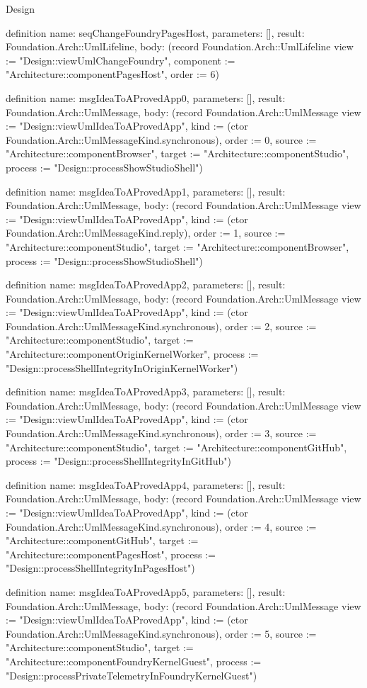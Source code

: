 \begin{lexlean}{Design}
\begin{semanticmodule}
definition{
  name: seqChangeFoundryPagesHost,
  parameters: [],
  result: Foundation.Arch::UmlLifeline,
  body: (record Foundation.Arch::UmlLifeline {view := "Design::viewUmlChangeFoundry", component := "Architecture::componentPagesHost", order := 6})
}

definition{
  name: msgIdeaToAProvedApp0,
  parameters: [],
  result: Foundation.Arch::UmlMessage,
  body: (record Foundation.Arch::UmlMessage {view := "Design::viewUmlIdeaToAProvedApp", kind := (ctor Foundation.Arch::UmlMessageKind.synchronous), order := 0, source := "Architecture::componentBrowser", target := "Architecture::componentStudio", process := "Design::processShowStudioShell"})
}

definition{
  name: msgIdeaToAProvedApp1,
  parameters: [],
  result: Foundation.Arch::UmlMessage,
  body: (record Foundation.Arch::UmlMessage {view := "Design::viewUmlIdeaToAProvedApp", kind := (ctor Foundation.Arch::UmlMessageKind.reply), order := 1, source := "Architecture::componentStudio", target := "Architecture::componentBrowser", process := "Design::processShowStudioShell"})
}

definition{
  name: msgIdeaToAProvedApp2,
  parameters: [],
  result: Foundation.Arch::UmlMessage,
  body: (record Foundation.Arch::UmlMessage {view := "Design::viewUmlIdeaToAProvedApp", kind := (ctor Foundation.Arch::UmlMessageKind.synchronous), order := 2, source := "Architecture::componentStudio", target := "Architecture::componentOriginKernelWorker", process := "Design::processShellIntegrityInOriginKernelWorker"})
}

definition{
  name: msgIdeaToAProvedApp3,
  parameters: [],
  result: Foundation.Arch::UmlMessage,
  body: (record Foundation.Arch::UmlMessage {view := "Design::viewUmlIdeaToAProvedApp", kind := (ctor Foundation.Arch::UmlMessageKind.synchronous), order := 3, source := "Architecture::componentStudio", target := "Architecture::componentGitHub", process := "Design::processShellIntegrityInGitHub"})
}

definition{
  name: msgIdeaToAProvedApp4,
  parameters: [],
  result: Foundation.Arch::UmlMessage,
  body: (record Foundation.Arch::UmlMessage {view := "Design::viewUmlIdeaToAProvedApp", kind := (ctor Foundation.Arch::UmlMessageKind.synchronous), order := 4, source := "Architecture::componentGitHub", target := "Architecture::componentPagesHost", process := "Design::processShellIntegrityInPagesHost"})
}

definition{
  name: msgIdeaToAProvedApp5,
  parameters: [],
  result: Foundation.Arch::UmlMessage,
  body: (record Foundation.Arch::UmlMessage {view := "Design::viewUmlIdeaToAProvedApp", kind := (ctor Foundation.Arch::UmlMessageKind.synchronous), order := 5, source := "Architecture::componentStudio", target := "Architecture::componentFoundryKernelGuest", process := "Design::processPrivateTelemetryInFoundryKernelGuest"})
}


\end{semanticmodule}
\end{lexlean}
